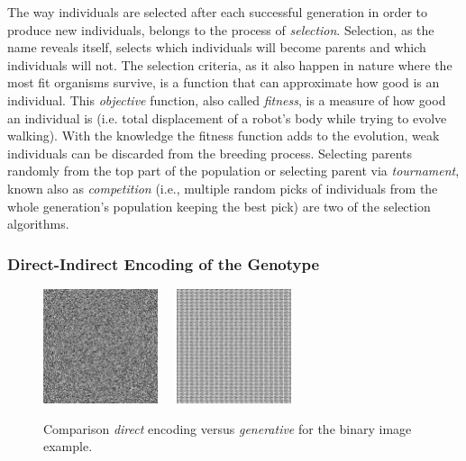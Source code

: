 The way individuals are selected after each successful generation in order to produce new individuals, belongs to the process of \emph{selection}. Selection, as the name reveals itself, selects which individuals will become parents and which individuals will not. The selection criteria, as it also happen in nature where the most fit organisms survive, is a function that can approximate how good is an individual. This \emph{objective} function, also called \emph{fitness}, is a measure of how good an individual is (i.e. total displacement of a robot's body while trying to evolve walking). With the knowledge the fitness function adds to the evolution, weak individuals can be discarded from the breeding process. Selecting parents randomly from the top part of the population or selecting parent via \emph{tournament}, known also as \emph{competition} (i.e., multiple random picks of individuals from the whole generation's population keeping the best pick) are two of the selection algorithms.


\subsubsection*{Direct-Indirect Encoding of the Genotype}

\begin{figure}
\centering
\includegraphics[width=0.3\textwidth]{../Figures/Misc/direct.jpg}\  \   \   
\includegraphics[width=0.3\textwidth]{../Figures/Misc/indirect.jpg}
\caption{Comparison \emph{direct} encoding versus \emph{generative} for the binary image example.}
\label{fig:directVsIndirectEncoding}
\end{figure}



